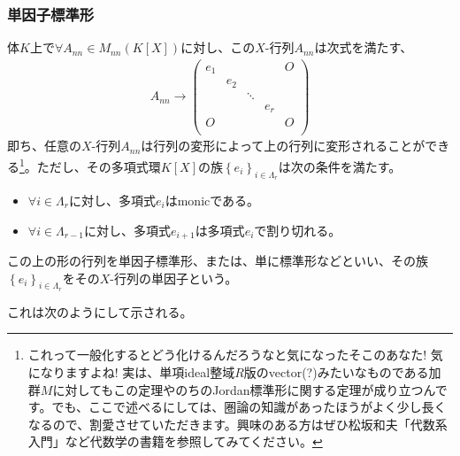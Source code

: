 \documentclass[dvipdfmx]{jsarticle}
\begin{document}
\subsubsection{単因子標準形}%
\begin{thm}[単因子標準形の存在性]\label{2.2.8.2}
体$K$上で$\forall A_{nn} \in M_{nn}\left( K[ X] \right)$に対し、この$X$-行列$A_{nn}$は次式を満たす、
\begin{align*}
A_{nn} \rightarrow \begin{pmatrix}
e_{1} & \  & \  & \  & O \\
\  & e_{2} & \  & \  & \  \\
\  & \  & \ddots & \  & \  \\
\  & \  & \  & e_{r} & \  \\
O & \  & \  & \  & O \\
\end{pmatrix}
\end{align*}
即ち、任意の$X$-行列$A_{nn}$は行列の変形によって上の行列に変形されることができる\footnote{これって一般化するとどう化けるんだろうなと気になったそこのあなた! 気になりますよね! 実は、単項ideal整域$R$版のvector(?)みたいなものである加群$M$に対してもこの定理やのちのJordan標準形に関する定理が成り立つんです。でも、ここで述べるにしては、圏論の知識があったほうがよく少し長くなるので、割愛させていただきます。興味のある方はぜひ松坂和夫「代数系入門」など代数学の書籍を参照してみてください。}。ただし、その多項式環$K[ X]$の族$\left\{ e_{i} \right\}_{i \in \varLambda_{r}}$は次の条件を満たす。
\begin{itemize}
\item
  $\forall i \in \varLambda_{r}$に対し、多項式$e_{i}$はmonicである。
\item
  $\forall i \in \varLambda_{r - 1}$に対し、多項式$e_{i + 1}$は多項式$e_{i}$で割り切れる。
\end{itemize}
この上の形の行列を単因子標準形、または、単に標準形などといい、その族$\left\{ e_{i} \right\}_{i \in \varLambda_{r}}$をその$X$-行列の単因子という。
\end{thm}\par
これは次のようにして示される。
\end{document}
